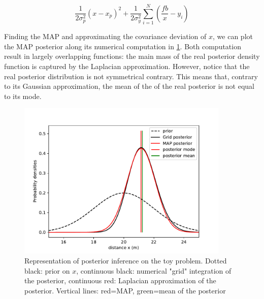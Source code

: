 \begin{equation}
    \frac{1}{2 \sigma_p^2}(x - x_p)^2 + \frac{1}{2\sigma_y^2} \sum_{i=1}^N (\frac{fb}{x} - y_i)
\end{equation}

Finding the MAP and approximating the covariance deviation of $x$, we can plot the MAP posterior along its numerical computation in \ref{fig:MAP_stereo1D}. 
Both computation result in largely overlapping functions: the main mass of the real posterior density function is captured by the Laplacian approximation.
However, notice that the real posterior distribution is not symmetrical contrary. This means that, contrary to its Gaussian approximation, the mean of the
of the real posterior is not equal to its mode. 

\begin{figure}[h]
    \centering
    \includegraphics[width=0.9\textwidth]{figures/MAP_stereo1D.pdf}
    \caption{Representation of posterior inference on the toy problem. Dotted black: prior on $x$, 
    continuous black: numerical "grid" integration of the posterior, continuous red: Laplacian approximation of the posterior. Vertical lines: red=MAP, green=mean of the posterior
    }
    \label{fig:MAP_stereo1D}
 \end{figure}




